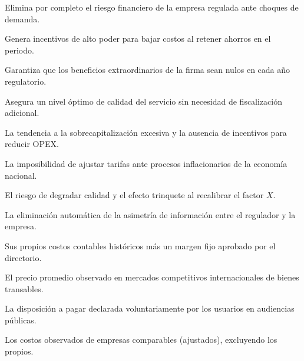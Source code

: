 \begin{opts}
    \item Elimina por completo el riesgo financiero de la empresa regulada ante choques de demanda.
    \item Genera incentivos de alto poder para bajar costos al retener ahorros en el periodo.
    \item Garantiza que los beneficios extraordinarios de la firma sean nulos en cada año regulatorio.
    \item Asegura un nivel óptimo de calidad del servicio sin necesidad de fiscalización adicional.
\end{opts}

\begin{opts}
    \item La tendencia a la sobrecapitalización excesiva y la ausencia de incentivos para reducir OPEX.
    \item La imposibilidad de ajustar tarifas ante procesos inflacionarios de la economía nacional.
    \item El riesgo de degradar calidad y el efecto trinquete al recalibrar el factor $X$.
    \item La eliminación automática de la asimetría de información entre el regulador y la empresa.
\end{opts}

\begin{opts}
    \item Sus propios costos contables históricos más un margen fijo aprobado por el directorio.
    \item El precio promedio observado en mercados competitivos internacionales de bienes transables.
    \item La disposición a pagar declarada voluntariamente por los usuarios en audiencias públicas.
    \item Los costos observados de empresas comparables (ajustados), excluyendo los propios.
\end{opts}

